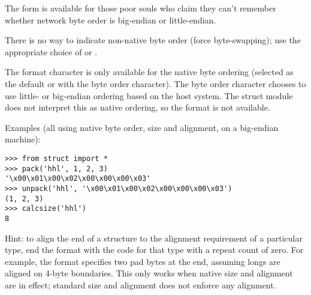 The form \character{!} is available for those poor souls who claim they
can't remember whether network byte order is big-endian or
little-endian.

There is no way to indicate non-native byte order (force
byte-swapping); use the appropriate choice of \character{<} or
\character{>}.

The  format character is only available for the native
byte ordering (selected as the default or with the  byte
order character). The byte order character \character{=} chooses to
use little- or big-endian ordering based on the host system. The
struct module does not interpret this as native ordering, so the
 format is not available.

Examples (all using native byte order, size and alignment, on a
big-endian machine):

\begin{verbatim}
>>> from struct import *
>>> pack('hhl', 1, 2, 3)
'\x00\x01\x00\x02\x00\x00\x00\x03'
>>> unpack('hhl', '\x00\x01\x00\x02\x00\x00\x00\x03')
(1, 2, 3)
>>> calcsize('hhl')
8
\end{verbatim}

Hint: to align the end of a structure to the alignment requirement of
a particular type, end the format with the code for that type with a
repeat count of zero.  For example, the format 
specifies two pad bytes at the end, assuming longs are aligned on
4-byte boundaries.  This only works when native size and alignment are
in effect; standard size and alignment does not enforce any alignment.

\begin{seealso}
\end{seealso}
